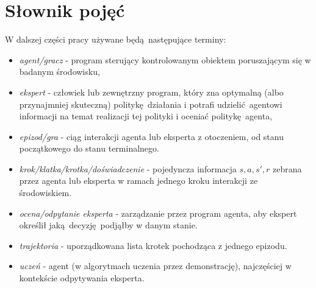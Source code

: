 \section{Słownik pojęć}

W dalszej części pracy używane będą następujące terminy:

\begin{itemize}
\item \textit{agent/gracz} - program sterujący kontrolowanym obiektem poruszającym się w badanym środowisku,
\item \textit{ekspert} - człowiek lub zewnętrzny program, który zna optymalną (albo przynajmniej skuteczną) politykę działania i potrafi udzielić agentowi informacji na temat realizacji tej polityki i oceniać politykę agenta,
\item \textit{epizod/gra} - ciąg interakcji agenta lub eksperta z otoczeniem, od stanu początkowego do stanu terminalnego.
\item \textit{krok/klatka/krotka/doświadczenie} - pojedyncza informacja $s,a,s',r$ zebrana przez agenta lub eksperta w ramach jednego kroku interakcji ze środowiskiem.  
\item \textit{ocena/odpytanie eksperta} - zarządzanie przez program agenta, aby ekspert określił jaką decyzję podjąłby w danym stanie.
\item \textit{trajektoria} - uporządkowana lista krotek pochodząca z jednego epizodu.
\item \textit{uczeń} - agent (w algorytmach uczenia przez demonstrację), najczęściej w kontekście odpytywania eksperta.
\end{itemize}

